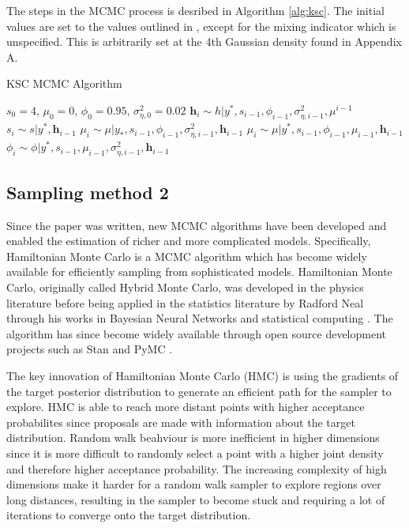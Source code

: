 \documentclass[12pt, a4paper]{article}
\begin{document}
        The steps in the MCMC process is desribed in Algorithm \ref{alg:ksc}. The initial values are set to the values outlined in \citet{kim1998stochastic}, except for the mixing indicator which is unspecified. This is arbitrarily set at the 4th Gaussian density found in Appendix A.

        \begin{algorithm}[H]
            \caption{KSC MCMC Algorithm}\label{alg:ksc}
            \begin{algorithmic}
            \Require $s_0 = 4$, $\mu_0 = 0$, $\phi_0 = 0.95$, $\sigma^{2}_{\eta,0} = 0.02$
                    \State {} $\boldsymbol{h}_i \sim h|y^{\ast}, s_{i-1}, \phi_{i-1}, \sigma^{2}_{\eta,i-1}, \mu^{i-1}$ 
                    \State {} $s_i \sim s|y^{\ast}, \boldsymbol{h}_{i-1}$
                    \State {} $\mu_i \sim \mu|y_{\ast}, s_{i-1}, \phi_{i-1}, \sigma^{2}_{\eta, i-1}, \boldsymbol{h}_{i-1}$
                    \State {} $\mu_i \sim \mu|y^{\ast}, s_{i-1}, \phi_{i-1}, \mu_{i-1}, \boldsymbol{h}_{i-1}$
                    \State {} $\phi_i \sim \phi|y^{\ast}, s_{i-1}, \mu_{i-1}, \sigma^{2}_{\eta, i-1}, \boldsymbol{h}_{i-1}$
                  \EndFor
            \end{algorithmic}
            \end{algorithm}

    \subsection{Sampling method 2}
        Since the paper was written, new MCMC algorithms have been developed and enabled the estimation of richer and more complicated models. Specifically, Hamiltonian Monte Carlo is a MCMC algorithm which has become widely available for efficiently sampling from sophisticated models. Hamiltonian Monte Carlo, originally called Hybrid Monte Carlo, was developed in the physics literature \citep{duane1987hybrid} before being applied in the statistics literature by Radford Neal through his works in Bayesian Neural Networks \citep{neal1995bayesian} and statistical computing \citep{neal2011mcmc}. The algorithm has since become widely available through open source development projects such as Stan \citep{stan} and PyMC \citep{pymc2023}.


        The key innovation of Hamiltonian Monte Carlo (HMC) is using the gradients of the target posterior distribution to generate an efficient path for the sampler to explore. HMC is able to reach more distant points with higher acceptance probabilites since proposals are made with information about the target distribution. Random walk beahviour is more inefficient in higher dimensions since it is more difficult to randomly select a point with a higher joint density and therefore higher acceptance probability. The increasing complexity of high dimensions make it harder for a random walk sampler to explore regions over long distances, resulting in the sampler to become stuck and requiring a lot of iterations to converge onto the target distribution. 
\end{document}
